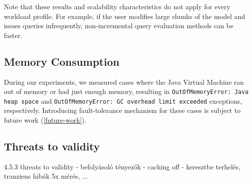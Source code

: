 Note that these results and scalability characteristics do not apply for every workload profile. For example, if the user modifies large chunks of the model and issues queries infrequently, non-incremental query evaluation methods can be faster. 


\subsection{Memory Consumption}

During our experiments, we measured cases where the Java Virtual Machine ran out of memory or had just enough memory, resulting in \texttt{OutOfMemoryError: Java heap space} and \texttt{OutOfMemoryError: GC overhead limit exceeded} exceptions, respectively. Introducing fault-tolerance mechanism for these cases is subject to future work (\autoref{future-work}).  
  



% 
% 
% 
% 

\subsection{Threats to validity}
\label{threats-to-validity}

4.5.3 threats to validity
  - befolyásoló tényezők
    - caching off
    - keresztbe terhelés, tranziens hibák 5x mérés, ...

